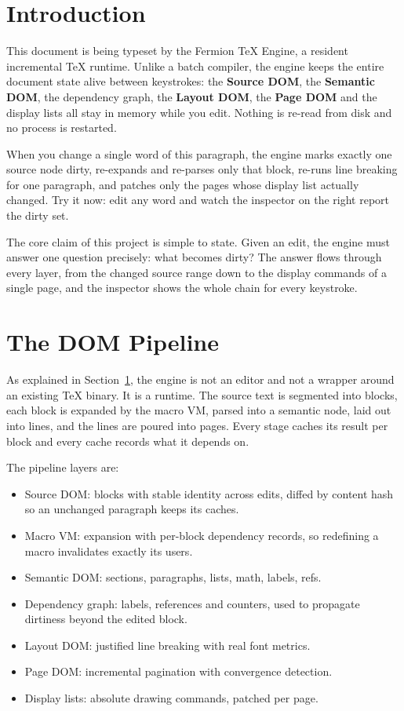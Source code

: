 \documentclass{article}
\newcommand{\term}[1]{\textbf{#1}}
\newcommand{\engine}{Fermion TeX Engine}
\begin{document}
\section{Introduction}
\label{sec:intro}

This document is being typeset by the \engine, a resident incremental
TeX runtime. Unlike a batch compiler, the engine keeps the entire
document state alive between keystrokes: the \term{Source DOM}, the
\term{Semantic DOM}, the dependency graph, the \term{Layout DOM}, the
\term{Page DOM} and the display lists all stay in memory while you
edit. Nothing is re-read from disk and no process is restarted.

When you change a single word of this paragraph, the engine marks
exactly one source node dirty, re-expands and re-parses only that
block, re-runs line breaking for one paragraph, and patches only the
pages whose display list actually changed. Try it now: edit any word
and watch the inspector on the right report the dirty set.

The core claim of this project is simple to state. Given an edit, the
engine must answer one question precisely: what becomes dirty? The
answer flows through every layer, from the changed source range down
to the display commands of a single page, and the inspector shows the
whole chain for every keystroke.

\section{The DOM Pipeline}
\label{sec:pipeline}

As explained in Section~\ref{sec:intro}, the engine is not an editor
and not a wrapper around an existing TeX binary. It is a runtime. The
source text is segmented into blocks, each block is expanded by the
macro VM, parsed into a semantic node, laid out into lines, and the
lines are poured into pages. Every stage caches its result per block
and every cache records what it depends on.

The pipeline layers are:

\begin{itemize}
\item Source DOM: blocks with stable identity across edits, diffed by
  content hash so an unchanged paragraph keeps its caches.
\item Macro VM: expansion with per-block dependency records, so
  redefining a macro invalidates exactly its users.
\item Semantic DOM: sections, paragraphs, lists, math, labels, refs.
\item Dependency graph: labels, references and counters, used to
  propagate dirtiness beyond the edited block.
\item Layout DOM: justified line breaking with real font metrics.
\item Page DOM: incremental pagination with convergence detection.
\item Display lists: absolute drawing commands, patched per page.
\end{itemize}
\end{document}

